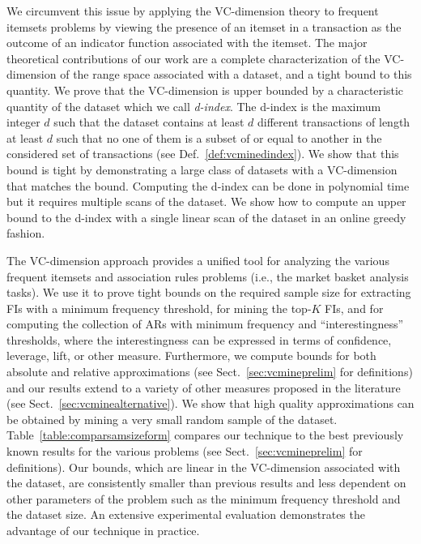 We circumvent this issue by applying the VC-dimension theory to
frequent itemsets problems by viewing the presence of an itemset in a
transaction as the outcome of an indicator function associated with the itemset.
The major theoretical contributions of our work are a complete characterization
of the VC-dimension of the range space associated with a dataset, and a tight
bound to this quantity. We prove that the VC-dimension is upper bounded by a
characteristic quantity of the dataset
which we call \emph{d-index}. The d-index is the maximum integer $d$ such that the
dataset contains at least $d$ different transactions of length at least $d$ such
that no one of them is a subset of or equal to another in the considered set
of transactions (see Def.~\ref{def:vcminedindex}). We show that this bound is tight
by
demonstrating a large class of datasets with a VC-dimension that matches the
bound. Computing the d-index can be done in polynomial time but it requires
multiple scans of the dataset. We show how to compute an upper bound to the
d-index with a single linear scan of the dataset in an online greedy fashion.

The VC-dimension approach provides a unified tool for analyzing the various
frequent itemsets and association rules problems (i.e., the market basket
analysis tasks). We use it to prove tight bounds on the required
sample size for extracting FIs with a minimum frequency threshold, for mining
the top-$K$ FIs, and for computing the collection of ARs with minimum
frequency and ``interestingness'' thresholds, where the interestingness can be
expressed in terms of confidence, leverage, lift, or other measure.
Furthermore, we compute bounds for both absolute and relative approximations
(see
Sect.~\ref{sec:vcmineprelim} for definitions) and our results extend to a variety
of other measures proposed in the literature (see Sect.~\ref{sec:vcminealternative}).
We show that high quality approximations can be obtained by mining a very small
random sample of the dataset. Table~\ref{table:comparsamsizeform} compares our
technique to the best previously known results for the various problems (see
Sect.~\ref{sec:vcmineprelim} for definitions). Our bounds, which are linear in the
VC-dimension associated with the dataset, are consistently smaller than previous
results and less dependent on other parameters of the problem such as the
minimum frequency threshold and the dataset size. An extensive
experimental evaluation demonstrates the advantage of our technique in practice.

